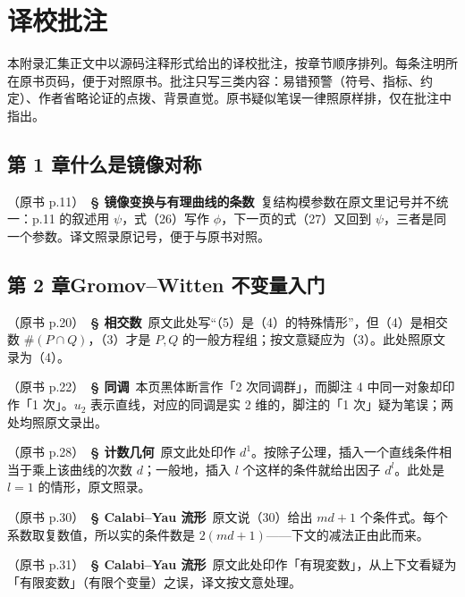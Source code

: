 \chapter{译校批注}

本附录汇集正文中以源码注释形式给出的译校批注，按章节顺序排列。每条注明所在原书页码，便于对照原书。批注只写三类内容：易错预警（符号、指标、约定）、作者省略论证的点拨、背景直觉。原书疑似笔误一律照原样排，仅在批注中指出。\par\medskip

\section*{第 1 章\quad 什么是镜像对称}

\noindent （原书 p.11）\ \textbf{§ 镜像变换与有理曲线的条数}\ 复结构模参数在原文里记号并不统一：p.11 的叙述用 $\psi$，式（26）写作 $\phi$，下一页的式（27）又回到 $\psi$，三者是同一个参数。译文照录原记号，便于与原书对照。\par\smallskip

\section*{第 2 章\quad Gromov--Witten 不变量入门}

\noindent （原书 p.20）\ \textbf{§ 相交数}\ 原文此处写“（5）是（4）的特殊情形”，但（4）是相交数 $\#(P\cap Q)$，（3）才是 $P,Q$ 的一般方程组；按文意疑应为（3）。此处照原文录为（4）。\par\smallskip

\noindent （原书 p.22）\ \textbf{§ 同调}\ 本页黑体断言作「2 次同调群」，而脚注 4 中同一对象却印作「1 次」。$u_2$ 表示直线，对应的同调是实 2 维的，脚注的「1 次」疑为笔误；两处均照原文录出。\par\smallskip

\noindent （原书 p.28）\ \textbf{§ 计数几何}\ 原文此处印作 $d^1$。按除子公理，插入一个直线条件相当于乘上该曲线的次数 $d$；一般地，插入 $l$ 个这样的条件就给出因子 $d^l$。此处是 $l=1$ 的情形，原文照录。\par\smallskip

\noindent （原书 p.30）\ \textbf{§ Calabi--Yau 流形}\ 原文说（30）给出 $md+1$ 个条件式。每个系数取复数值，所以实的条件数是 $2(md+1)$——下文的减法正由此而来。\par\smallskip

\noindent （原书 p.31）\ \textbf{§ Calabi--Yau 流形}\ 原文此处印作「有現変数」，从上下文看疑为「有限変数」（有限个变量）之误，译文按文意处理。\par\smallskip

